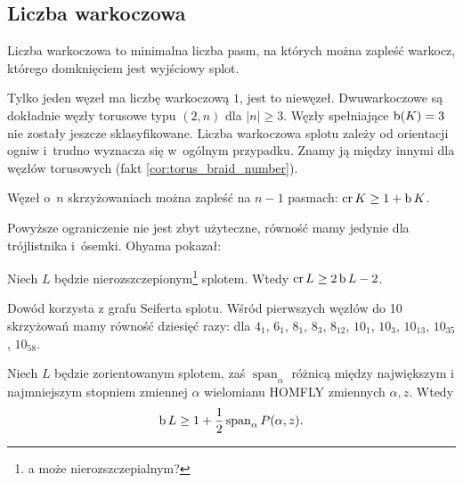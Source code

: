 
\subsection{Liczba warkoczowa}
%

\begin{definition}
\label{def:braid_number}%
    Liczba warkoczowa to minimalna liczba pasm, na których można zapleść warkocz, którego domknięciem jest wyjściowy splot.
\end{definition}

Tylko jeden węzeł ma liczbę warkoczową $1$, jest to niewęzeł.
Dwuwarkoczowe są dokładnie węzły torusowe typu $(2, n)$ dla $|n| \ge 3$.
Węzły spełniające $\operatorname{b} (K) = 3$ nie zostały jeszcze sklasyfikowane.
Liczba warkoczowa splotu zależy od orientacji ogniw i~trudno wyznacza się w~ogólnym przypadku.
Znamy ją między innymi dla węzłów torusowych (fakt \ref{cor:torus_braid_number}).

\begin{proposition}
    Węzeł o~$n$ skrzyżowaniach można zapleść na $n - 1$ pasmach: $\operatorname{cr} K \ge 1 + \operatorname{b} K$.
\end{proposition}

Powyższe ograniczenie nie jest zbyt użyteczne, równość mamy jedynie dla trójlistnika i~ósemki.
Ohyama \cite{ohyama93} pokazał:
%

\begin{proposition}
    Niech $L$ będzie nierozszczepionym\footnote{a może nierozszczepialnym?} splotem.
    Wtedy $\operatorname{cr} L \ge 2 \operatorname{b} L - 2$.
\end{proposition}

Dowód korzysta z grafu Seiferta splotu.
%
Wśród pierwszych węzłów do 10 skrzyżowań mamy równość dziesięć razy: dla $4_1$, $6_1$, $8_1$, $8_3$, $8_{12}$, $10_1$, $10_3$, $10_{13}$, $10_{35}$, $10_{58}$.

\begin{proposition}
%
    Niech $L$ będzie zorientowanym splotem, zaś $\operatorname{span}_\alpha$ różnicą między największym i najmniejszym stopniem zmiennej $\alpha$ wielomianu HOMFLY zmiennych $\alpha, z$.
    Wtedy
    \begin{equation}
        \operatorname{b} L \ge 1 + \frac 1 2 \operatorname{span}_\alpha P(\alpha, z).
    \end{equation}
\end{proposition}

